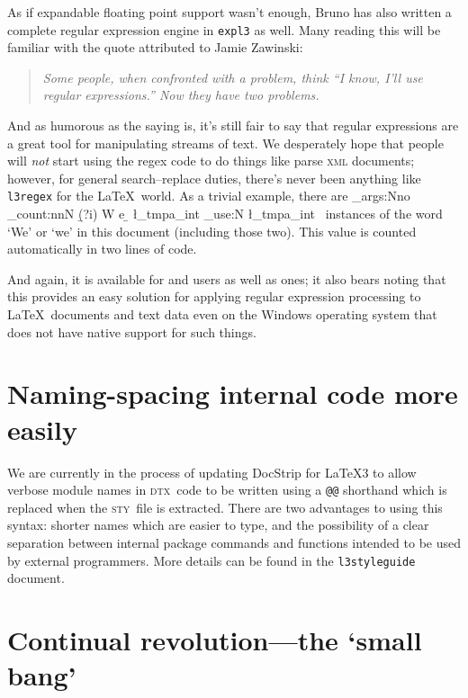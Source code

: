 \documentclass{ltnews}
\def\DTX{\textsc{dtx}}
\def\STY{\textsc{sty}}
\begin{document}
As if expandable floating point support wasn't enough, Bruno has also written a complete regular expression engine in \texttt{expl3} as well.
Many reading this will be familiar with the quote attributed to Jamie Zawinski:
\begin{quote}\itshape
Some people, when confronted with a problem, think
``I know, I'll use regular expressions.''
Now they have two problems.
\end{quote}
And as humorous as the saying is, it's still fair to say that regular expressions are a great tool for manipulating streams of text.
We desperately hope that people will \emph{not} start using the regex code to do things like parse \textsc{xml} documents; however, for general search--replace duties, there's never been anything like \texttt{l3regex} for the \LaTeX\ world.
As a trivial example, there are
\CatchFileDef{}%
\ExplSyntaxOn
\exp_args:Nno \regex_count:nnN { \b (?i) W e \b  } {\thisfile} \l_tmpa_int
\int_use:N \l_tmpa_int
\ExplSyntaxOff
~instances of the word `We' or `we' in this document (including those two).
This value is counted automatically in two lines of code.

And again, it is available for  and  users as well as  ones; it also bears noting that this provides an easy solution for applying regular expression processing to \LaTeX\ documents and text data even on the Windows operating system that does not have native support for such things.


\section{Naming-spacing internal code more easily}

We are currently in the process of updating \textsf{DocStrip} for \LaTeX3 to allow verbose module names in \DTX\ code to be written using a \texttt{@@} shorthand which is replaced when the \STY\ file is extracted.
There are two advantages to using this syntax: shorter names which are easier to type, and the possibility of a clear separation between internal package commands and functions intended to be used by external programmers.
More details can be found in the \texttt{l3styleguide} document.


\section{Continual revolution---the `small bang'}
\end{document}

